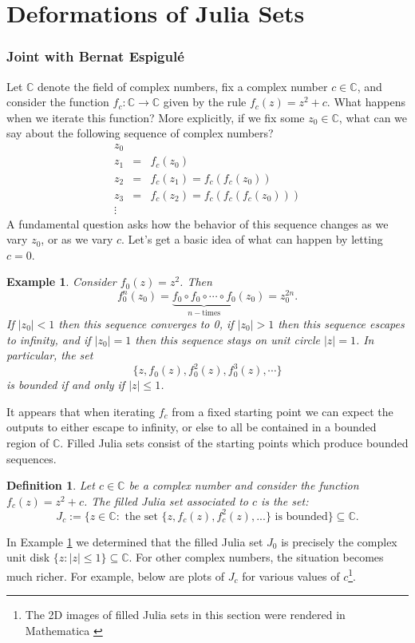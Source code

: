 \documentclass[12 pt]{article}
\newcommand{\bC}{\mathbb{C}}
\newtheorem{definition}{Definition}
\newtheorem{example}{Example}
\begin{document}
\section{Deformations of Julia Sets}\label{juliaSection}
\subsubsection*{Joint with Bernat Espigul\'e}
Let $\bC$ denote the field of complex numbers, fix a complex number $c\in\bC$, and consider the function $f_c:\bC\to\bC$ given by the rule $f_c(z) = z^2+c$.  What happens when we iterate this function?  More explicitly, if we fix some $z_0\in\bC$, what can we say about the following sequence of complex numbers?
\begin{eqnarray*}
z_0&&\\
z_1 &=& f_c(z_0)\\
z_2 &=& f_c(z_1) = f_c(f_c(z_0))\\
z_3 &=& f_c(z_2) = f_c(f_c(f_c(z_0)))\\
\vdots&&
\end{eqnarray*}
A fundamental question asks how the behavior of this sequence changes as we vary $z_0$, or as we vary $c$.  Let's get a basic idea of what can happen by letting $c=0$.
\begin{example}\label{circleExample}
Consider $f_{0}(z) = z^2$.  Then
\[f_0^n(z_0) = \underbrace{f_0\circ f_0\circ\cdots\circ f_0}_{n-\text{times}}(z_0) =
z_0^{2n}.\]
If $|z_0|<1$ then this sequence converges to 0, if $|z_0|>1$ then this sequence escapes to infinity, and if $|z_0|=1$ then this sequence stays on unit circle $|z|=1$.  In particular, the set
\[\{z,f_0(z),f_0^2(z),f_0^3(z),\cdots\}\]
is bounded if and only if $|z|\le1$.
\end{example}
It appears that when iterating $f_c$ from a fixed starting point we can expect the outputs to either escape to infinity, or else to all be contained in a bounded region of $\bC$.  Filled Julia sets consist of the starting points which produce bounded sequences.
\begin{definition}\label{JuliaSetDefinition}
Let $c\in\bC$ be a complex number and consider the function $f_c(z) = z^2+c$.  The \emph{filled Julia set} associated to $c$ is the set:
\[J_c:=\{z\in\bC : \text{ the set }\{z,f_c(z),f_c^2(z),...\}\text{ is bounded}\}\subseteq\bC.\]
\end{definition}
In Example \ref{circleExample} we determined that the filled Julia set $J_0$ is precisely the complex unit disk $\{z:|z|\le1\}\subseteq\bC$.  For other complex numbers, the situation becomes much richer.  For example, below are plots of $J_c$ for various values of $c$\footnote{The 2D images of filled Julia sets in this section were rendered in Mathematica \cite{Mathematica}}.
\end{document}
